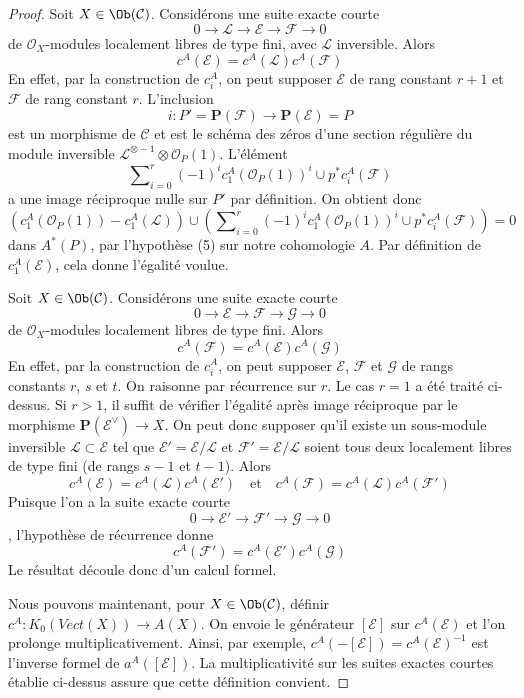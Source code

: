 \begin{proof}
\medskip\noindent
Soit $X \in \Ob(\mathcal{C})$. Considérons une suite exacte courte
$$
0 \to \mathcal{L} \to \mathcal{E} \to \mathcal{F} \to 0
$$
de $\mathcal{O}_X$-modules localement libres de type fini, avec $\mathcal{L}$ inversible.
Alors
$$
c^A(\mathcal{E}) = c^A(\mathcal{L}) c^A(\mathcal{F})
$$
En effet, par la construction de $c^A_i$, on peut supposer $\mathcal{E}$
de rang constant $r + 1$ et $\mathcal{F}$ de rang constant $r$.
L'inclusion
$$
i : P' = \mathbf{P}(\mathcal{F}) \longrightarrow \mathbf{P}(\mathcal{E}) = P
$$
est un morphisme de $\mathcal{C}$ et est le schéma des zéros d'une section
régulière du module inversible
$\mathcal{L}^{\otimes -1} \otimes \mathcal{O}_P(1)$.
L'élément
$$
\sum\nolimits_{i = 0}^r (-1)^i c_1^A(\mathcal{O}_P(1))^i \cup
p^*c^A_i(\mathcal{F})
$$
a une image réciproque nulle sur $P'$ par définition. On obtient donc
$$
\left(c_1^A(\mathcal{O}_P(1)) - c_1^A(\mathcal{L})\right) \cup
\left(\sum\nolimits_{i = 0}^r (-1)^i c_1^A(\mathcal{O}_P(1))^i \cup
p^*c^A_i(\mathcal{F})\right) = 0
$$
dans $A^*(P)$, par l'hypothèse (5) sur notre cohomologie $A$.
Par définition de $c_1^A(\mathcal{E})$,
cela donne l'égalité voulue.

\medskip\noindent
Soit $X \in \Ob(\mathcal{C})$. Considérons une suite exacte courte
$$
0 \to \mathcal{E} \to \mathcal{F} \to \mathcal{G} \to 0
$$
de $\mathcal{O}_X$-modules localement libres de type fini. Alors
$$
c^A(\mathcal{F}) = c^A(\mathcal{E}) c^A(\mathcal{G})
$$
En effet, par la construction de $c^A_i$, on peut supposer
$\mathcal{E}$, $\mathcal{F}$ et $\mathcal{G}$
de rangs constants $r$, $s$ et $t$. On raisonne par récurrence sur $r$.
Le cas $r = 1$ a été traité ci-dessus. Si $r > 1$, il suffit de vérifier
l'égalité après image réciproque par le morphisme $\mathbf{P}(\mathcal{E}^\vee) \to X$.
On peut donc supposer qu'il existe un sous-module inversible
$\mathcal{L} \subset \mathcal{E}$ tel que
$\mathcal{E}' = \mathcal{E}/\mathcal{L}$ et
$\mathcal{F}' = \mathcal{E}/\mathcal{L}$ soient tous deux localement libres de type fini
(de rangs $s - 1$ et $t - 1$). Alors
$$
c^A(\mathcal{E}) = c^A(\mathcal{L}) c^A(\mathcal{E}')
\quad\text{et}\quad
c^A(\mathcal{F}) = c^A(\mathcal{L}) c^A(\mathcal{F}')
$$
Puisque l'on a la suite exacte courte
$$
0 \to \mathcal{E}' \to \mathcal{F}' \to \mathcal{G} \to 0
$$,
l'hypothèse de récurrence donne
$$
c^A(\mathcal{F}') = c^A(\mathcal{E}') c^A(\mathcal{G})
$$
Le résultat découle donc d'un calcul formel.

\medskip\noindent
Nous pouvons maintenant, pour $X \in \Ob(\mathcal{C})$,
définir $c^A : K_0(\textit{Vect}(X)) \to A(X)$.
On envoie le générateur $[\mathcal{E}]$ sur $c^A(\mathcal{E})$
et l'on prolonge multiplicativement. Ainsi, par exemple,
$c^A(-[\mathcal{E}]) = c^A(\mathcal{E})^{-1}$ est l'inverse
formel de $a^A([\mathcal{E}])$.
La multiplicativité sur les suites exactes courtes établie ci-dessus
assure que cette définition convient.


\end{proof}
